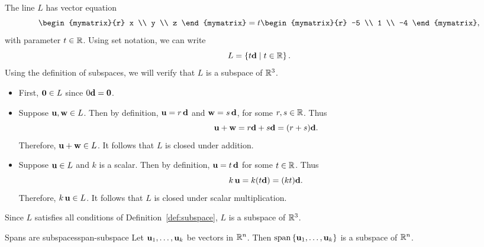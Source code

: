 \begin{solution}
  The line $L$ has vector equation
  \begin{equation*}
    \begin{mymatrix}{r} x \\ y \\ z \end{mymatrix}
    =t\begin{mymatrix}{r} -5 \\ 1 \\ -4 \end{mymatrix},
  \end{equation*}
  with parameter $t\in\mathbb{R}$. Using set notation, we can write
  \begin{equation*}
    L=\left\{t{\mbox{\bf d}} \mid t\in\mathbb{R}\right\}.
  \end{equation*}
  Using the definition of subspaces, we will verify that $L$ is a
  subspace of $\mathbb{R}^3$.
  \begin{itemize}
  \item First, $\mbox{\bf 0}\in L$ since $0\mbox{\bf d}=\mbox{\bf 0}$.
  \item Suppose $\mbox{\bf u},\mbox{\bf w}\in L$.
    Then by definition, $\mbox{\bf u}=r\,\mbox{\bf d}$ and $\mbox{\bf w}=s\,\mbox{\bf d}$, 
    for some $r,s\in\mathbb{R}$.
    Thus
    \begin{equation*}
      \mbox{\bf u}+\mbox{\bf w} = r\mbox{\bf d}+s\mbox{\bf d} = (r+s)\mbox{\bf d}.
    \end{equation*}
    Therefore, $\mbox{\bf u}+\mbox{\bf w}\in L$. It follows that $L$ is closed
    under addition.
  \item Suppose $\mbox{\bf u}\in L$ and $k$ is a scalar. Then by
    definition, $\mbox{\bf u}=t\,\mbox{\bf d}$ for some $t\in\mathbb{R}$. Thus
    \begin{equation*}
      k\,\mbox{\bf u}=k(t\mbox{\bf d})=(kt)\mbox{\bf d}.
    \end{equation*}
    Therefore, $k\,\mbox{\bf u}\in L$. It follows that $L$ is closed under
    scalar multiplication.
  \end{itemize}
  Since $L$ satisfies all conditions of Definition~\ref{def:subspace},
  $L$ is a subspace of $\mathbb{R}^3$.
\end{solution}

\begin{proposition}{Spans are subspaces}{span-subspace}
  Let $\mbox{\bf u}_1,\ldots,\mbox{\bf u}_k$ be vectors in $\mathbb{R}^{n}$. Then
  $\sspan\set{\vect{u}_1,\ldots,\vect{u}_k}$ is a subspace of
  $\mathbb{R}^{n}$.%
\end{proposition}

